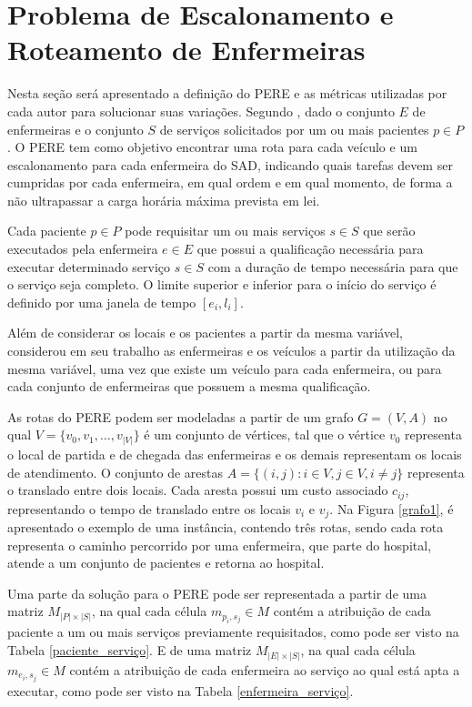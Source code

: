 \section{\esp Problema de Escalonamento e Roteamento de Enfermeiras }\label{pad}

Nesta seção será apresentado a definição do \acl{PERE} e as métricas utilizadas por cada autor para solucionar suas variações.
Segundo , dado o conjunto $E$ de enfermeiras e o conjunto $S$ de serviços solicitados por um ou mais pacientes $p \in P$. 
O \ac{PERE} tem como objetivo encontrar uma rota para cada veículo e um escalonamento para cada enfermeira do \ac{SAD}, indicando quais tarefas devem ser cumpridas por cada enfermeira, em qual ordem e em qual momento, de forma a não ultrapassar a carga horária máxima prevista em lei.

Cada paciente $p\in P$ pode requisitar um ou mais serviços $s \in S$ que serão executados pela enfermeira $e \in E$  que possui a qualificação necessária para executar determinado serviço $s \in S$ com a duração de tempo necessária para que o serviço seja completo. O limite superior e inferior para o início do serviço é definido por uma janela de tempo $[e_i, l_i]$.

Além de considerar os locais e os pacientes a partir da mesma variável,  considerou em seu trabalho as enfermeiras e os veículos a partir da utilização da mesma variável, uma vez que existe um veículo para cada enfermeira, ou para cada conjunto de enfermeiras que possuem a mesma qualificação.

As rotas do \ac{PERE} podem ser modeladas a partir de um grafo  $G = (V, A)$ no qual $V= \{ v_0, v_1, \ldots, v_{|V|} \}$ é um conjunto de vértices, tal que o vértice $v_0$ representa o local de partida e de chegada das enfermeiras e os demais representam os locais de atendimento. O conjunto de arestas $A = \{(i,j): i\in V, j \in V, i \neq j\}$ representa o translado entre dois locais. 
Cada aresta possui um custo associado $c_{ij}$, representando o tempo de translado entre os locais $v_i$ e $v_j$.
Na Figura \ref{grafo1}, é apresentado o exemplo de uma instância, contendo três rotas, sendo cada rota representa o caminho percorrido por uma enfermeira, que parte do hospital, atende a um conjunto de pacientes e retorna ao hospital.

Uma parte da solução para o \ac{PERE} pode ser representada a partir de uma matriz $M_{|P|\times |S|}$, na qual cada célula $m_{p_i,s_j} \in M$ contém a atribuição de cada paciente a um ou mais serviços previamente requisitados, como pode ser visto na Tabela \ref{paciente_serviço}.
E de uma matriz $M_{|E|\times |S|}$, na qual cada célula $m_{e_i,s_j} \in M$ contém a atribuição de cada enfermeira ao serviço ao qual está apta a executar, como pode ser visto na Tabela \ref{enfermeira_serviço}.

